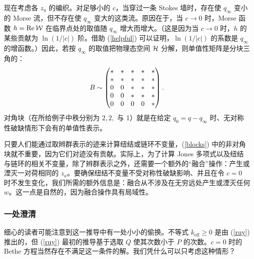
现在考虑各 $z_a$ 的编织。对足够小的 $c$，当穿过一条 Stokes 墙时，存在使 $q_\infty$ 变小的 Morse 流，但不存在使 $q_\infty$ 变大的这类流。原因在于，当 $c\to 0$ 时，Morse 函数 $h=\mathrm{Re}\,{\mathcal W}$ 在临界点处的取值随 $q_\infty$ 增大而增大。（这是因为当 $c\to 0$ 时，$h$ 的某些贡献为 $\ln(1/|c|)$ 阶。借助 (\ref{helpful}) 可以证明，$\ln(1/|c|)$ 的系数是 $q_\infty$ 的增函数。）因此，若按 $q_\infty$ 的取值把物理态空间 ${\mathcal H}$ 分解，则单值性矩阵是分块三角的：
\begin{equation}\label{blocks}B\sim \begin{pmatrix} *& *&* & * & * \cr  *&*&*&*&*\cr
                                                                                   0& 0 & *&* & *\cr 0&0&*&*&*\cr
                                                                         0&0&           0 & 0 & * \cr \end{pmatrix}.\end{equation}
对角块（在所给例子中秩分别为 $2,2,$ 与 1）就是在给定 $q_0=q-q_\infty$ 时、无对称性破缺情形下会有的单值性表示。

只要人们能通过取辫群表示的迹来计算纽结或链环不变量，(\ref{blocks}) 中的非对角块就不重要，因为它们对迹没有贡献。实际上，为了计算 Jones 多项式以及纽结与链环的相关不变量，除了辫群表示之外，还需要一个额外的“融合”操作：产生或湮灭一对荷相同的 $z_a$。要确保纽结不变量不受对称性破缺影响、并且在令 $c=0$ 时不发生变化，我们所需的额外信息是：融合从不涉及在无穷远处产生或湮灭任何 $w$。这一点是自然的，因为融合操作具有局域性。

\subsubsection{一处澄清}\label{clarify}

细心的读者可能注意到这一推导中有一处小小的偷换。不等式 $k_{\mathrm{eff}}\geq 0$ 是由 (\ref{ruy}) 推出的，但 (\ref{ruy}) 最初的推导基于选取 $Q$ 使其次数小于 $P$ 的次数。$c=0$ 时的 Bethe 方程当然存在不满足这一条件的解。我们凭什么可以只考虑这种情形？

